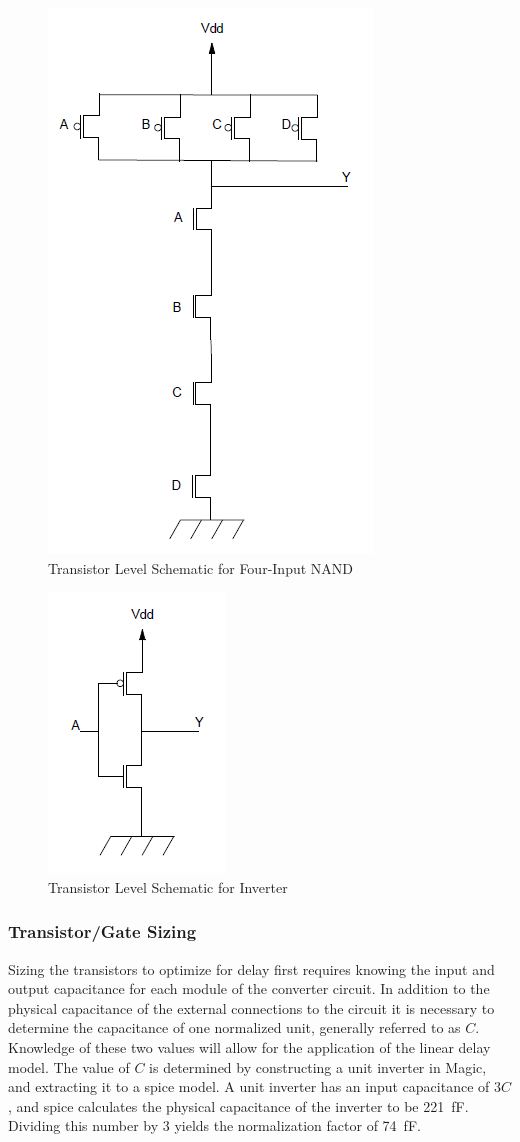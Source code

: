 \documentclass[12pt]{article}
\begin{document}
\begin{figure}[H]
	\centering
	\includegraphics[width=0.3\linewidth, keepaspectratio]{NAND_4_Trans.png}
	\caption{Transistor Level Schematic for Four-Input NAND}
	\label{fig:4nandTran}
\end{figure}

\begin{figure}[H]
	\centering
	\includegraphics[width=0.3\linewidth, keepaspectratio]{NOT_Trans.png}
	\caption{Transistor Level Schematic for Inverter}
	\label{fig:notTran}
\end{figure}

\newpage
\subsubsection{Transistor/Gate Sizing}
Sizing the transistors to optimize for delay first requires knowing the input and output capacitance for each module of the converter circuit. 
In addition to the physical capacitance of the external connections to the circuit it is necessary to determine the capacitance of one normalized unit, generally referred to as \(C\).
Knowledge of these two values will allow for the application of the linear delay model.
The value of \(C\) is determined by constructing a unit inverter in Magic, and extracting it to a spice model.
A unit inverter has an input capacitance of \(3C\), and spice calculates the physical capacitance of the inverter to be \SI{221}{\femto\farad}.
Dividing this number by 3 yields the normalization factor of \SI{74}{\femto\farad}.
\end{document}
